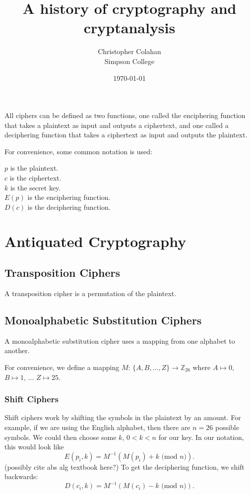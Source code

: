\documentclass[12pt]{article}
\title{A history of cryptography and cryptanalysis}
\date{\today}
\author{Christopher Colahan\\ Simpson College}
\begin{document}
\maketitle
\newpage

\tableofcontents
\listoffigures
\newpage


All ciphers can be defined as two functions, one called the enciphering function that takes a plaintext as input and outputs a ciphertext, and one called a deciphering function that takes a ciphertext as input and outputs the plaintext.

For convenience, some common notation is used:

{\centering
	$p$ is the plaintext.\\
	$c$ is the ciphertext.\\
	$k$ is the secret key.\\
	$E(p)$ is the enciphering function.\\
	$D(c)$ is the deciphering function.\\
}

\section{Antiquated Cryptography}
\subsection{Transposition Ciphers}
A transposition cipher is a permutation of the plaintext.

\subsection{Monoalphabetic Substitution Ciphers}

A monoalphabetic substitution cipher uses a mapping from one alphabet to another.

For convenience, we define a mapping $M$: $\{A,B,..., Z\} \rightarrow \mathbb{Z}_{26}$ where $A\mapsto 0$, $B\mapsto 1$, ... $Z\mapsto 25$.

\subsubsection{Shift Ciphers}
Shift ciphers work by shifting the symbols in the plaintext by an amount. For example, if we are using the English alphabet, then there are $n=26$ possible symbols. We could then choose some $k$, $0<k<n$ for our key. In our notation, this would look like
$$E(p_i,k)=M^{-1}(M(p_i)+k\text{ (mod $n$)}).$$ (possibly cite abs alg textbook here?)
To get the deciphering function, we shift backwards:
$$D(c_i,k)=M^{-1}(M(c_i)-k\text{ (mod $n$)}).$$
\end{document}
